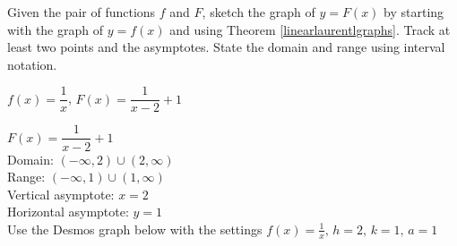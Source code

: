 \documentclass{ximera}
\begin{document}
\begin{problem}\label{rationaltransfirst}
Given the pair of functions $f$ and $F$, sketch the graph of $y=F(x)$ by starting with the graph of $y = f(x)$ and using Theorem \ref{linearlaurentlgraphs}.  Track at least two points and the asymptotes.  State the domain and range using interval notation.

$f(x) = \dfrac{1}{x}$,  $F(x) = \dfrac{1}{x-2}+1$

\begin{solution}
$F(x) = \dfrac{1}{x-2}+1$ \\
Domain: $(-\infty, 2) \cup (2, \infty)$ \\
Range: $(-\infty, 1) \cup (1, \infty)$ \\
Vertical asymptote:  $x = 2$\\
Horizontal asymptote:  $y = 1$ \\

Use the Desmos graph below with the settings $f(x)=\frac{1}{x},\,h=2,\,k=1,\,a=1$

\begin{center} 
\end{center}






\end{solution}
\end{problem}
\end{document}
